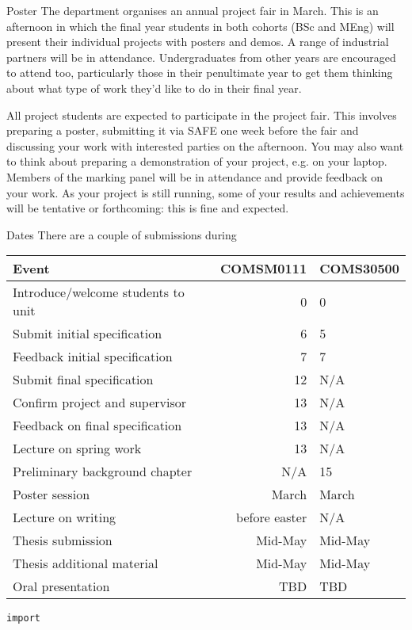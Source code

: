 \documentclass[presentation]{beamer}
\begin{document}
\begin{frame}[label={sec:orga9afbc9}]{Poster}
The department organises an annual project fair in March. This is an afternoon in which the final year students in both cohorts (BSc and MEng) will present their individual projects with posters and demos. A range of industrial partners will be in attendance. Undergraduates from other years are encouraged to attend too, particularly those in their penultimate year to get them thinking about what type of work they’d like to do in their final year.

All project students are expected to participate in the project fair. This involves preparing a poster, submitting it via SAFE \alert{one week} before the fair and discussing your work with interested parties on the afternoon. You may also want to think about preparing a demonstration of your project, e.g. on your laptop. Members of the marking panel will be in attendance and provide feedback on your work. As your project is still running, some of your results and achievements will be tentative or forthcoming: this is fine and expected.
\end{frame}
\begin{frame}[fragile,label={sec:org4274b4f}]{Dates}
 There are a couple of submissions during

\begin{center}
\begin{center}
\begin{tabular}{lrl}
Event & COMSM0111 & COMS30500\\
\hline
Introduce/welcome students to unit & 0 & 0\\
Submit initial specification & 6 & 5\\
Feedback initial specification & 7 & 7\\
Submit final specification & 12 & N/A\\
Confirm project and supervisor & 13 & N/A\\
Feedback on final specification & 13 & N/A\\
Lecture on spring work & 13 & N/A\\
Preliminary background chapter & N/A & 15\\
Poster session & March & March\\
Lecture on writing & before easter & N/A\\
Thesis submission & Mid-May & Mid-May\\
Thesis additional material & Mid-May & Mid-May\\
Oral presentation & TBD & TBD\\
\end{tabular}

\end{center}
\end{center}

\begin{verbatim}
import 

\end{verbatim}
\end{frame}
\end{document}
